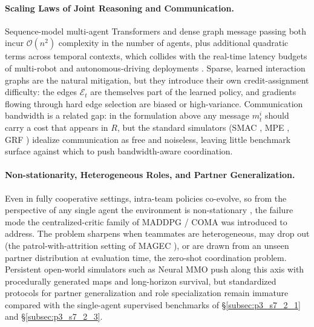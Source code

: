 \paragraph{Scaling Laws of Joint Reasoning and Communication.}
Sequence-model multi-agent Transformers and dense graph message passing both incur $\mathcal{O}(n^2)$ complexity in the number of agents, plus additional quadratic terms across temporal contexts, which collides with the real-time latency budgets of multi-robot \cite{goeckner2024magec} and autonomous-driving deployments \cite{ettinger2021womd,caesar2020nuscenes}.
Sparse, learned interaction graphs are the natural mitigation, but they introduce their own credit-assignment difficulty: the edges $\mathcal{E}_t$ are themselves part of the learned policy, and gradients flowing through hard edge selection are biased or high-variance.
Communication bandwidth is a related gap: in the formulation above any message $m^i_t$ should carry a cost that appears in $R$, but the standard simulators (SMAC \cite{samvelyan2019smac}, MPE \cite{lowe2017maddpg}, GRF \cite{kurach2020grf}) idealize communication as free and noiseless, leaving little benchmark surface against which to push bandwidth-aware coordination.

\paragraph{Non-stationarity, Heterogeneous Roles, and Partner Generalization.}
Even in fully cooperative settings, intra-team policies co-evolve, so from the perspective of any single agent the environment is non-stationary \cite{lowe2017maddpg}, the failure mode the centralized-critic family of MADDPG / COMA \cite{lowe2017maddpg,foerster2018coma} was introduced to address.
The problem sharpens when teammates are heterogeneous, may drop out (the patrol-with-attrition setting of MAGEC \cite{goeckner2024magec}), or are drawn from an unseen partner distribution at evaluation time, the zero-shot coordination problem.
Persistent open-world simulators such as Neural MMO \cite{mmo20aamas,MMO23nips} push along this axis with procedurally generated maps and long-horizon survival, but standardized protocols for partner generalization and role specialization remain immature compared with the single-agent supervised benchmarks of §\ref{subsec:p3_s7_2_1} and §\ref{subsec:p3_s7_2_3}.

